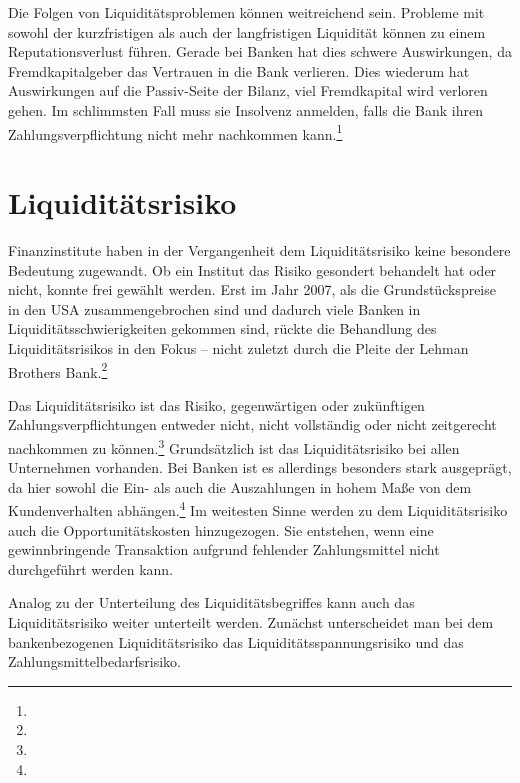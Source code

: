 \begin{onehalfspacing}
Die Folgen von Liquiditätsproblemen können weitreichend sein. Probleme mit sowohl der kurzfristigen als auch der langfristigen Liquidität können zu einem Reputationsverlust führen. Gerade bei Banken hat dies schwere Auswirkungen, da Fremdkapitalgeber das Vertrauen in die Bank verlieren. Dies wiederum hat Auswirkungen auf die Passiv-Seite der Bilanz, viel Fremdkapital wird verloren gehen. Im schlimmsten Fall muss sie Insolvenz anmelden, falls die Bank ihren Zahlungsverpflichtung nicht mehr nachkommen kann.\footnote{ }

\section{Liquiditätsrisiko}
Finanzinstitute haben in der Vergangenheit dem Liquiditätsrisiko keine besondere Bedeutung zugewandt. Ob ein Institut das Risiko gesondert behandelt hat oder nicht, konnte frei gewählt werden. Erst im Jahr 2007, als die Grundstückspreise in den USA zusammengebrochen sind und dadurch viele Banken in Liquiditätsschwierigkeiten gekommen sind, rückte die Behandlung des Liquiditätsrisikos in den Fokus -- nicht zuletzt durch die Pleite der Lehman Brothers Bank.\footnote{ }


Das Liquiditätsrisiko ist das Risiko, gegenwärtigen oder zukünftigen Zahlungsverpflichtungen entweder nicht, nicht vollständig oder nicht zeitgerecht nachkommen zu können.\footnote{  } Grundsätzlich ist das Liquiditätsrisiko bei allen Unternehmen vorhanden. Bei Banken ist es allerdings besonders stark ausgeprägt, da hier sowohl die Ein- als auch die Auszahlungen in hohem Maße von dem Kundenverhalten abhängen.\footnote{ } Im weitesten Sinne werden zu dem Liquiditätsrisiko auch die Opportunitätskosten hinzugezogen. Sie entstehen, wenn eine gewinnbringende Transaktion aufgrund fehlender Zahlungsmittel nicht durchgeführt werden kann.

Analog zu der Unterteilung des Liquiditätsbegriffes kann auch das Liquiditätsrisiko weiter unterteilt werden. Zunächst unterscheidet man bei dem bankenbezogenen Liquiditätsrisiko das Liquiditätsspannungsrisiko und das Zahlungsmittelbedarfsrisiko.


\end{onehalfspacing}
